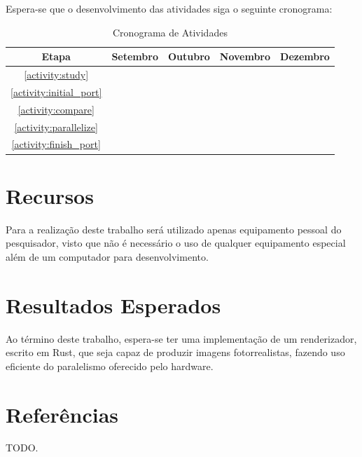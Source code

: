 \documentclass[12pt]{article}
\newcommand{\todo}[1]{\textsf{\color{red}#1}}
\begin{document}
Espera-se que o desenvolvimento das atividades siga o seguinte cronograma:

\begin{table}[h]
\centering
\begin{tabular}{c|cccc}
	Etapa & Setembro & Outubro & Novembro & Dezembro \\ \hline
	\ref{activity:study} & \checkmark & & & \\
	\ref{activity:initial_port} & \checkmark & \checkmark & & \\
	\ref{activity:compare} & & \checkmark & & \checkmark \\
	\ref{activity:parallelize} & & \checkmark & \checkmark & \checkmark \\
	\ref{activity:finish_port} & & & \checkmark & \checkmark \\
\end{tabular}
\caption{Cronograma de Atividades}
\end{table}

\section{Recursos}

Para a realização deste trabalho será utilizado apenas equipamento pessoal do pesquisador, visto que
não é necessário o uso de qualquer equipamento especial além de um computador para desenvolvimento.

\section{Resultados Esperados}

Ao término deste trabalho, espera-se ter uma implementação de um renderizador, escrito em Rust, que
seja capaz de produzir imagens fotorrealistas, fazendo uso eficiente do paralelismo oferecido pelo
hardware.

\section{Referências}

\todo{TODO.}
\end{document}
